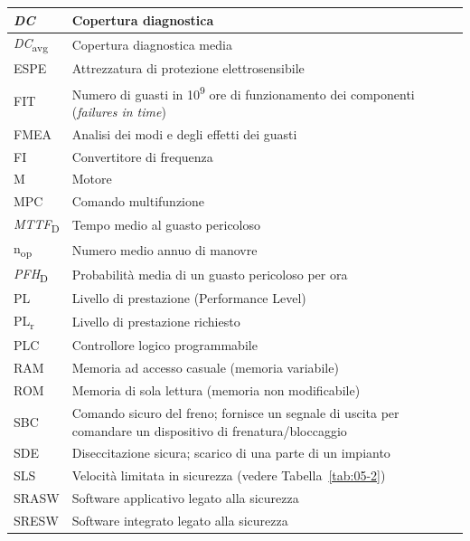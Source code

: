 \begin{longtable}{|p{2.4cm}|p{\dimexpr\textwidth-2.4cm-4\tabcolsep-3\arrayrulewidth\relax}|}
    \rowcolor{black!8}
    \textit{DC} & Copertura diagnostica \\
    \hline
    \textit{DC}\textsubscript{avg} & Copertura diagnostica media \\
    \hline
    \rowcolor{black!8}
    ESPE & Attrezzatura di protezione elettrosensibile \\
    \hline
    FIT & Numero di guasti in 10\textsuperscript{9} ore di funzionamento dei componenti (\textit{failures in time}) \\
    \hline
    \rowcolor{black!8}
    FMEA & Analisi dei modi e degli effetti dei guasti \\
    \hline
    FI & Convertitore di frequenza \\
    \hline
    \rowcolor{black!8}
    M & Motore \\
    \hline
    MPC & Comando multifunzione \\
    \hline
    \rowcolor{black!8}
    \textit{MTTF}\textsubscript{D} & Tempo medio al guasto pericoloso \\
    \hline
    n\textsubscript{op} & Numero medio annuo di manovre \\
    \hline
    \rowcolor{black!8}
    \textit{PFH}\textsubscript{D} & Probabilità media di un guasto pericoloso per ora \\
    \hline
    PL & Livello di prestazione (Performance Level) \\
    \hline
    \rowcolor{black!8}
    PL\textsubscript{r} & Livello di prestazione richiesto \\
    \hline
    PLC & Controllore logico programmabile \\
    \hline
    \rowcolor{black!8}
    RAM & Memoria ad accesso casuale (memoria variabile) \\
    \hline
    ROM & Memoria di sola lettura (memoria non modificabile) \\
    \hline
    \rowcolor{black!8}
    SBC & Comando sicuro del freno; fornisce un segnale di uscita per comandare un dispositivo di frenatura/bloccaggio \\
    \hline
    SDE & Diseccitazione sicura; scarico di una parte di un impianto \\
    \hline
    \rowcolor{black!8}
    SLS & Velocità limitata in sicurezza (vedere Tabella~\ref{tab:05-2}) \\
    \hline
    SRASW & Software applicativo legato alla sicurezza \\
    \hline
    \rowcolor{black!8}
    SRESW & Software integrato legato alla sicurezza \\

\end{longtable}
